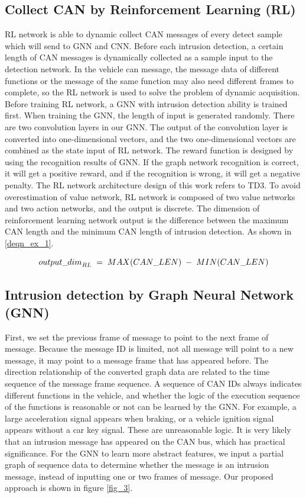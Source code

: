 \documentclass[lettersize,journal]{IEEEtran}
\begin{document}
\subsection{Collect CAN by Reinforcement Learning (RL)}
RL network is able to dynamic collect CAN messages of every detect sample which will send to GNN and CNN. Before each intrusion detection, a certain length of CAN messages is dynamically collected as a sample input to the detection network. In the vehicle can message, the message data of different functions or the message of the same function may also need different frames to complete, so the RL network is used to solve the problem of dynamic acquisition. Before training RL network, a GNN with intrusion detection ability is trained first. When training the GNN, the length of input is generated randomly. There are two convolution layers in our GNN. The output of the convolution layer is converted into one-dimensional vectors, and the two one-dimensional vectors are combined as the state input of RL network. The reward function is designed by using the recognition results of GNN. If the graph network recognition is correct, it will get a positive reward, and if the recognition is wrong, it will get a negative penalty. The RL network architecture design of this work refers to TD3\cite{43}. To avoid overestimation of value network, RL network is composed of two value networks and two action networks, and the output is discrete. The dimension of reinforcement learning network output is the difference between the maximum CAN length and the minimum CAN length of intrusion detection. As shown in \eqref{deqn_ex_1}.

\begin{equation}
\label{deqn_ex_1}
\footnotesize {{output\_dim}_{RL}\ =\ MAX(CAN\_LEN)\ -\ MIN(CAN\_LEN)}
\end{equation}

\subsection{Intrusion detection by Graph Neural Network (GNN)}
First, we set the previous frame of message to point to the next frame of message. Because the message ID is limited, not all message will point to a new message, it may point to a message frame that has appeared before. The direction relationship of the converted graph data are related to the time sequence of the message frame sequence. A sequence of CAN IDs always indicates different functions in the vehicle, and whether the logic of the execution sequence of the functions is reasonable or not can be learned by the GNN. For example, a large acceleration signal appears when braking, or a vehicle ignition signal appears without a car key signal. These are unreasonable logic. It is very likely that an intrusion message has appeared on the CAN bus, which has practical significance. For the GNN to learn more abstract features, we input a partial graph of sequence data to determine whether the message is an intrusion message, instead of inputting one or two frames of message. Our proposed approach is shown in figure \ref{fig_3}.
\end{document}
